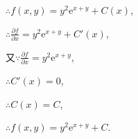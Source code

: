 \documentclass[12pt,UTF8]{ctexart}
\begin{document}
\begin{enumerate}
$\therefore f(x,y)=y^2\mathrm e^{x+y}+C(x)$,

$\therefore\frac{\partial f}{\partial x}=y^2\mathrm e^{x+y}+C'(x)$,

又$\because\frac{\partial f}{\partial x}=y^2\mathrm e^{x+y}$,

$\therefore C'(x)=0$,

$\therefore C(x)=C$,

$\therefore f(x,y)=y^2\mathrm e^{x+y}+C$.
\end{enumerate}
\end{document}
